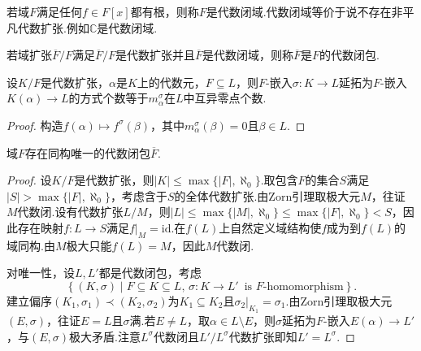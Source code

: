 若域$F$满足任何$f\in F[x]$都有根，则称$F$是{\heiti 代数闭域}.代数闭域等价于说不存在非平凡代数扩张.例如$\mathbb{C}$是代数闭域.

若域扩张$\overline{F}/F$满足$\overline{F}/F$是代数扩张并且$\overline{F}$是代数闭域，则称$\overline{F}$是$F$的{\heiti 代数闭包}.

\begin{lemma*}
    设$K/F$是代数扩张，$\alpha$是$K$上的代数元，$F\subseteq L$，则$F$-嵌入$\sigma\colon K\to L$延拓为$F$-嵌入$K(\alpha)\to L$的方式个数等于$m_\alpha^\sigma$在$L$中互异零点个数.
\end{lemma*}
\begin{proof}
    构造$f(\alpha)\mapsto f^\sigma(\beta)$，其中$m_\alpha^\sigma(\beta)=0$且$\beta\in L$.
\end{proof}
\begin{thm}
    域$F$存在同构唯一的代数闭包$\overline{F}$.
\end{thm}
\begin{proof}
    设$K/F$是代数扩张，则$|K|\le\max\{|F|,\aleph_0\}$.取包含$F$的集合$S$满足$|S|>\max\{|F|,\aleph_0\}$，考虑含于$S$的全体代数扩张.由Zorn引理取极大元$M$，往证$M$代数闭.设有代数扩张$L/M$，则$|L|\le\max\{|M|,\aleph_0\}\le\max\{|F|,\aleph_0\}<S$，因此存在映射$f\colon L\to S$满足$f|_M=\mathrm{id}$.在$f(L)$上自然定义域结构使$f$成为到$f(L)$的域同构.由$M$极大只能$f(L)=M$，因此$M$代数闭.

    对唯一性，设$L,L'$都是代数闭包，考虑
    \[
        \left\{(K,\sigma)\mid F\subseteq K\subseteq L,\,\sigma\colon K\to L'\enspace\text{is $F$-homomorphism}\right\}.
    \]
    建立偏序$(K_1,\sigma_1)\prec(K_2,\sigma_2)$为$K_1\subseteq K_2$且$\sigma_2|_{K_1}=\sigma_1$.由Zorn引理取极大元$(E,\sigma)$，往证$E=L$且$\sigma$满.若$E\ne L$，取$\alpha\in L\setminus E$，则$\sigma$延拓为$F$-嵌入$E(\alpha)\to L'$，与$(E,\sigma)$极大矛盾.注意$L^\sigma$代数闭且$L'/L^\sigma$代数扩张即知$L'=L^\sigma$.
\end{proof}

